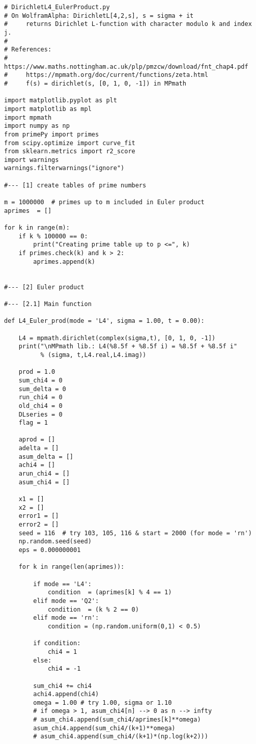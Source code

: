 \documentclass[oneside,10pt]{book}
\begin{document}
\begin{lstlisting}
# DirichletL4_EulerProduct.py
# On WolframAlpha: DirichletL[4,2,s], s = sigma + it
#     returns Dirichlet L-function with character modulo k and index j.
#
# References:
#     https://www.maths.nottingham.ac.uk/plp/pmzcw/download/fnt_chap4.pdf
#     https://mpmath.org/doc/current/functions/zeta.html
#     f(s) = dirichlet(s, [0, 1, 0, -1]) in MPmath

import matplotlib.pyplot as plt
import matplotlib as mpl
import mpmath
import numpy as np
from primePy import primes
from scipy.optimize import curve_fit
from sklearn.metrics import r2_score
import warnings
warnings.filterwarnings("ignore")

#--- [1] create tables of prime numbers

m = 1000000  # primes up to m included in Euler product
aprimes  = []  

for k in range(m):
    if k % 100000 == 0:
        print("Creating prime table up to p <=", k)
    if primes.check(k) and k > 2:
        aprimes.append(k)


#--- [2] Euler product

#--- [2.1] Main function

def L4_Euler_prod(mode = 'L4', sigma = 1.00, t = 0.00):

    L4 = mpmath.dirichlet(complex(sigma,t), [0, 1, 0, -1]) 
    print("\nMPmath lib.: L4(%8.5f + %8.5f i) = %8.5f + %8.5f i" 
          % (sigma, t,L4.real,L4.imag))

    prod = 1.0
    sum_chi4 = 0 
    sum_delta = 0
    run_chi4 = 0
    old_chi4 = 0
    DLseries = 0
    flag = 1

    aprod = [] 
    adelta = []
    asum_delta = []
    achi4 = []
    arun_chi4 = []
    asum_chi4 = []

    x1 = []
    x2 = []
    error1 = []
    error2 = []
    seed = 116  # try 103, 105, 116 & start = 2000 (for mode = 'rn')
    np.random.seed(seed)
    eps = 0.000000001

    for k in range(len(aprimes)): 
        
        if mode == 'L4':
            condition  = (aprimes[k] % 4 == 1)  
        elif mode == 'Q2':
            condition  = (k % 2 == 0)           
        elif mode == 'rn':
            condition = (np.random.uniform(0,1) < 0.5)
        
        if condition:   
            chi4 = 1
        else:
            chi4 = -1

        sum_chi4 += chi4 
        achi4.append(chi4)
        omega = 1.00 # try 1.00, sigma or 1.10
        # if omega > 1, asum_chi4[n] --> 0 as n --> infty
        # asum_chi4.append(sum_chi4/aprimes[k]**omega)
        asum_chi4.append(sum_chi4/(k+1)**omega) 
        # asum_chi4.append(sum_chi4/(k+1)*(np.log(k+2))) 


\end{lstlisting}
\end{document}
